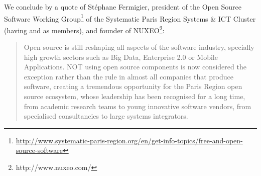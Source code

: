 We conclude by a quote of Stéphane Fermigier, president of the Open
Source Software Working Group\footnote{\url{http://www.systematic-paris-region.org/en/get-info-topics/free-and-open-source-software}}
of the Systematic Paris Region Systems \& ICT Cluster (having
 and  as members),
and founder of NUXEO\footnote{http://www.nuxeo.com/}:
\begin{quote}
  Open source is still reshaping all aspects of the software industry,
  specially high growth sectors such as Big Data, Enterprise 2.0 or
  Mobile Applications. NOT using open source components is now
  considered the exception rather than the rule in almost all
  companies that produce software, creating a tremendous opportunity
  for the Paris Region open source ecosystem, whose leadership has
  been recognised for a long time, from academic research teams to
  young innovative software vendors, from specialised consultancies to
  large systems integrators.
\end{quote}







